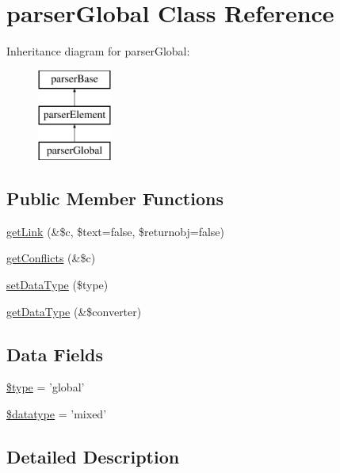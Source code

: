 \hypertarget{classparser_global}{\section{parser\-Global \-Class \-Reference}
\label{classparser_global}
}
\-Inheritance diagram for parser\-Global\-:\begin{figure}[H]
\begin{center}
\leavevmode
\includegraphics[height=3.000000cm]{classparser_global}
\end{center}
\end{figure}
\subsection*{\-Public \-Member \-Functions}
\begin{DoxyCompactItemize}
\item 
\hyperlink{classparser_global_a61479c5807f84ffb377b8b1702cbae23}{get\-Link} (\&\$c, \$text=false, \$returnobj=false)
\item 
\hyperlink{classparser_global_a3c0cda054b642b0209ddc1d36f1c061e}{get\-Conflicts} (\&\$c)
\item 
\hyperlink{classparser_global_a77cbd5787f59a2d5905167d98aa9eab5}{set\-Data\-Type} (\$type)
\item 
\hyperlink{classparser_global_a621385dfdcd0d2c5e834b7449232fa35}{get\-Data\-Type} (\&\$converter)
\end{DoxyCompactItemize}
\subsection*{\-Data \-Fields}
\begin{DoxyCompactItemize}
\item 
\hyperlink{classparser_global_a9a4a6fba2208984cabb3afacadf33919}{\$type} = 'global'
\item 
\hyperlink{classparser_global_a3797a5aa019a141b45d80b0106c59c2e}{\$datatype} = 'mixed'
\end{DoxyCompactItemize}


\subsection{\-Detailed \-Description}


